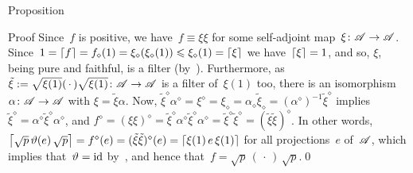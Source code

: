 \documentclass[a]{subfiles}
\begin{document}
\begin{parsec}
\begin{point}{Proposition}
\begin{point}{Proof}
Since~$f$ is positive,
we have~$f\equiv \xi \xi$ for some self-adjoint
map~$\xi\colon \mathscr{A}\to\mathscr{A}$.
Since~$1=\left\lceil f\right\rceil=f_\diamond(1)=
\xi_\diamond(\xi_\diamond(1))\leqslant \xi_\diamond(1)=\left\lceil\xi\right\rceil$
we have~$\left\lceil\xi\right\rceil=1$,
and so, $\xi$, being pure and faithful,
is a filter (by~).
Furthermore,
as~$\tilde\xi:=\sqrt{\xi(1)}(\,\cdot\,)\sqrt{\xi(1)}\colon \mathscr{A}\to\mathscr{A}$
is a filter of~$\xi(1)$ too,
there is an isomorphism~$\alpha\colon \mathscr{A}\to\mathscr{A}$
with $\xi=\tilde\xi\alpha$.
Now, $ {\tilde\xi}^\diamond \alpha^\diamond
={\xi}^\diamond={\xi}_\diamond
=\alpha_\diamond\tilde \xi_\diamond
= (\alpha^\diamond)^{-1}{\tilde\xi}^\diamond$
implies~${\tilde\xi}^\diamond = \alpha^\diamond 
{\tilde \xi}^\diamond \alpha^\diamond$,
and 
$f^\diamond= (\xi\xi)^\diamond
= {\tilde \xi}^\diamond\alpha^\diamond{\tilde \xi}^\diamond\alpha^\diamond
={\tilde \xi}^\diamond{\tilde \xi}^\diamond=(\tilde \xi\tilde \xi)^\diamond$.
In other words,
$\left\lceil\sqrt{p}\,\vartheta(e)\,\sqrt{p}\right\rceil
=f^\diamond(e)=(\tilde\xi\tilde\xi)^\diamond(e)
= \left\lceil\xi(1)\,e\,\xi(1)\right\rceil$
for all projections~$e$ of~$\mathscr{A}$,
which implies that~$\vartheta=\operatorname{id}$
by~,
and hence that~$f=\sqrt{p}\,(\,\cdot\,)\,\sqrt{p}$.\qed
\end{point}
\end{point}
\end{parsec}
\end{document}
